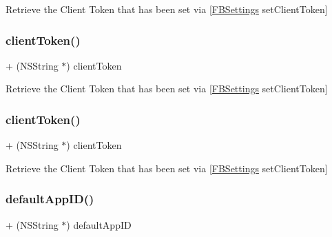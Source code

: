 Retrieve the Client Token that has been set via \mbox{[}\hyperlink{interfaceFBSettings}{F\+B\+Settings} set\+Client\+Token\mbox{]} \mbox{\label{interfaceFBSettings_afa1e8342398ddbdd7e6e9cd0a28094ac}} 
\subsubsection{\texorpdfstring{client\+Token()}{clientToken()}\hspace{0.1cm}{\footnotesize\ttfamily [4/5]}}
{\footnotesize\ttfamily + (N\+S\+String $\ast$) client\+Token \begin{DoxyParamCaption}{ }\end{DoxyParamCaption}}

Retrieve the Client Token that has been set via \mbox{[}\hyperlink{interfaceFBSettings}{F\+B\+Settings} set\+Client\+Token\mbox{]} \mbox{\label{interfaceFBSettings_afa1e8342398ddbdd7e6e9cd0a28094ac}} 
\subsubsection{\texorpdfstring{client\+Token()}{clientToken()}\hspace{0.1cm}{\footnotesize\ttfamily [5/5]}}
{\footnotesize\ttfamily + (N\+S\+String $\ast$) client\+Token \begin{DoxyParamCaption}{ }\end{DoxyParamCaption}}

Retrieve the Client Token that has been set via \mbox{[}\hyperlink{interfaceFBSettings}{F\+B\+Settings} set\+Client\+Token\mbox{]} \mbox{\label{interfaceFBSettings_af60cce044316df28d128d64e79a77ba5}} 
\subsubsection{\texorpdfstring{default\+App\+I\+D()}{defaultAppID()}\hspace{0.1cm}{\footnotesize\ttfamily [1/5]}}
{\footnotesize\ttfamily + (N\+S\+String $\ast$) default\+App\+ID \begin{DoxyParamCaption}{ }\end{DoxyParamCaption}}

